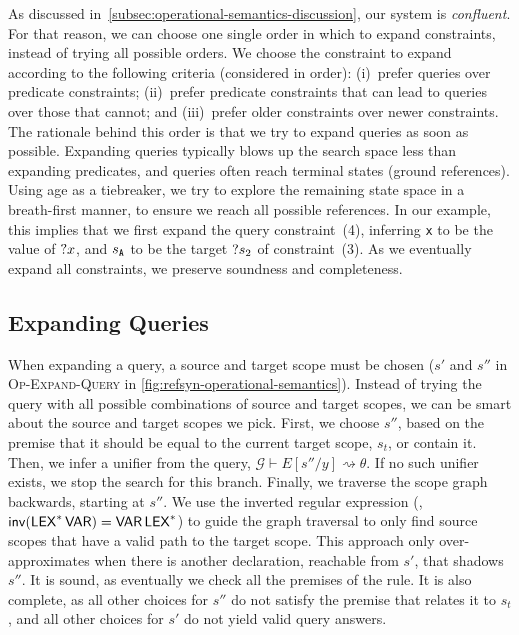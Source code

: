 As discussed in~\cref{subsec:operational-semantics-discussion}, our system is \emph{confluent}.
For that reason, we can choose one single order in which to expand constraints, instead of trying all possible orders.
We choose the constraint to expand according to the following criteria (considered in order):
(i)~prefer queries over predicate constraints;
(ii)~prefer predicate constraints that can lead to queries over those that cannot; and
(iii)~prefer older constraints over newer constraints.
%
The rationale behind this order is that we try to expand queries as soon as possible.
Expanding queries typically blows up the search space less than expanding predicates, and queries often reach terminal states (ground references).
Using age as a tiebreaker, we try to explore the remaining state space in a breath-first manner, to ensure we reach all possible references.
In our example, this implies that we first expand the query constraint~(4), inferring \texttt{x} to be the value of $\text{?$x$}$, and $s_{\texttt{A}}$ to be the target $\text{?$s_2$}$ of constraint~(3).
As we eventually expand all constraints, we preserve soundness and completeness.


\subsection{Expanding Queries}%
\label{subsec:expanding-queries}

When expanding a query, a source and target scope must be chosen ($s'$ and $s''$ in \textsc{Op-Expand-Query} in \cref{fig:refsyn-operational-semantics}).
Instead of trying the query with all possible combinations of source and target scopes, we can be smart about the source and target scopes we pick.
First, we choose $s''$, based on the premise that it should be equal to the current target scope, $s_t$, or contain it.
Then, we infer a unifier from the query, $\mathcal{G} \vdash E[s'' / y] \rightsquigarrow \theta$.
If no such unifier exists, we stop the search for this branch.
Finally, we traverse the scope graph backwards, starting at $s''$.
We use the inverted regular expression (\eg, $\mathsf{inv}(\mathsf{LEX}^\ast\, \mathsf{VAR}) = \mathsf{VAR}\, \mathsf{LEX}^\ast$) to guide the graph traversal to only find source scopes that have a valid path to the target scope.
This approach only over-approximates when there is another declaration, reachable from $s'$, that shadows $s''$.
It is sound, as eventually we check all the premises of the rule.
It is also complete, as all other choices for $s''$ do not satisfy the premise that relates it to $s_t$, and all other choices for $s'$ do not yield valid query answers.

